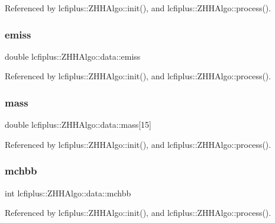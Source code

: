 Referenced by lcfiplus\+::\+Z\+H\+H\+Algo\+::init(), and lcfiplus\+::\+Z\+H\+H\+Algo\+::process().

\mbox{\label{structlcfiplus_1_1ZHHAlgo_1_1data_a587ce7b16726a5930ef82e2285a25075}} 
\subsubsection{emiss}
{\footnotesize\ttfamily double lcfiplus\+::\+Z\+H\+H\+Algo\+::data\+::emiss}



Referenced by lcfiplus\+::\+Z\+H\+H\+Algo\+::init(), and lcfiplus\+::\+Z\+H\+H\+Algo\+::process().

\mbox{\label{structlcfiplus_1_1ZHHAlgo_1_1data_a95e8ed7ac36797d3734fdb2942385809}} 
\subsubsection{mass}
{\footnotesize\ttfamily double lcfiplus\+::\+Z\+H\+H\+Algo\+::data\+::mass[15]}



Referenced by lcfiplus\+::\+Z\+H\+H\+Algo\+::init(), and lcfiplus\+::\+Z\+H\+H\+Algo\+::process().

\mbox{\label{structlcfiplus_1_1ZHHAlgo_1_1data_a5412322550b68bb50ec24bf408273fbb}} 
\subsubsection{mchbb}
{\footnotesize\ttfamily int lcfiplus\+::\+Z\+H\+H\+Algo\+::data\+::mchbb}



Referenced by lcfiplus\+::\+Z\+H\+H\+Algo\+::init(), and lcfiplus\+::\+Z\+H\+H\+Algo\+::process().

\mbox{\label{structlcfiplus_1_1ZHHAlgo_1_1data_a5a05ba28c8a2705c064babfc0edcd261}} 
